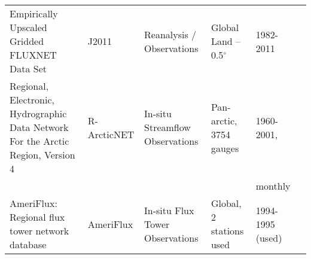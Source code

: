\begin{landscape}
\begin{table}[]
{\begin{tabular}{p{3in}lllll}
Empirically Upscaled Gridded FLUXNET Data Set                                    & J2011          & Reanalysis / Observations       & Global Land – 0.5$^{\circ}$               & 1982-2011                  & \citet{Jung_2011}            \\
Regional, Electronic, Hydrographic Data Network For the Arctic Region, Version 4 & R-ArcticNET    & In-situ Streamflow Observations & Pan-arctic, 3754 gauges          & 1960-2001,                 & \citet{Lammers_2001}         \\
                                                                                 &                &                                 &                                  & monthly                    &                              \\
AmeriFlux: Regional flux tower network database                                  & AmeriFlux      & In-situ Flux Tower Observations & Global, 2 stations used          & 1994-1995 (used)           &                              \\ \hline
\end{tabular}
}
\end{table}
\end{landscape}

\begin{table}[]
\centering
\caption{Variables analyzed and datasets each variable is compared to.}
\label{table:s4}
\end{table}

